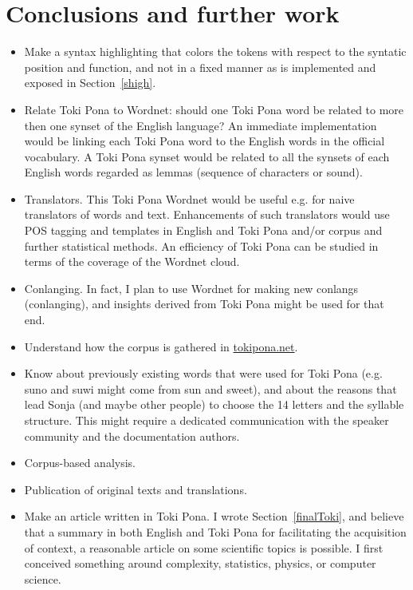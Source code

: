 \documentclass{article}
\begin{document}
\section{Conclusions and further work}\label{conc}
\begin{itemize}
  \item Make a syntax highlighting that colors the tokens with respect
    to the syntatic position and function, and not in a fixed manner
    as is implemented and exposed in Section~\ref{shigh}.
  \item Relate Toki Pona to Wordnet: should one Toki Pona word
    be related to more then one synset of the English language?
    An immediate implementation would be linking each Toki Pona word
    to the English words in the official vocabulary.
    A Toki Pona synset would be related to all the synsets of each English
    words regarded as lemmas (sequence of characters or sound).
  \item Translators. This Toki Pona Wordnet would be useful e.g. for naive translators
    of words and text.
    Enhancements of such translators would use POS tagging and templates
    in English and Toki Pona and/or corpus and further statistical methods.
    An efficiency of Toki Pona can be studied in terms of the coverage of
    the Wordnet cloud.
  \item Conlanging. In fact, I plan to use Wordnet for making new conlangs
    (conlanging), and insights derived from Toki Pona might be used for that end.
  \item Understand how the corpus is gathered in \url{tokipona.net}.
  \item Know about previously existing words that were used for Toki Pona
    (e.g. suno and suwi might come from sun and sweet),
    and about the reasons that lead Sonja (and maybe other people)
    to choose the 14 letters and the syllable structure.
    This might require a dedicated communication with the
    speaker community and the documentation authors.
  \item Corpus-based analysis.
  \item Publication of original texts and translations.
  \item Make an article written in Toki Pona.
    I wrote Section~\ref{finalToki}, and believe that
    a summary in both English and Toki Pona for
    facilitating the acquisition of context,
    a reasonable article on some scientific topics is
    possible.
    I first conceived something around complexity, statistics, physics, or computer science.

\end{itemize}
\end{document}

